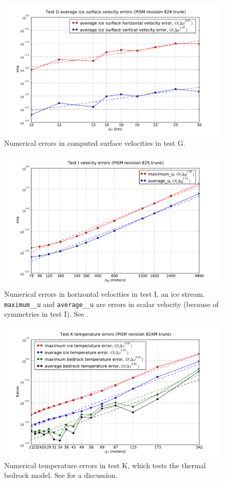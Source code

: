 \documentclass[11pt,final]{amsart}
\renewcommand{\t}[1]{\texttt{#1}}
\newcommand{\und}{\_\!\_}
\begin{document}
\begin{figure}[ht]
\includegraphics[width=5.0in,keepaspectratio=true]{figs/test-G-surfvels}
\caption{Numerical errors in computed surface velocities in test G.}
\label{fig:surfvelerrsG}
\end{figure}

\begin{figure}[ht]
\includegraphics[width=5.0in,keepaspectratio=true]{figs/test-I-errors}
\caption{Numerical errors in horizontal velocities in test I, an ice stream. \t{maximum\und u} and \t{average\und u} are errors in scalar velocity (because of symmetries in test I).  See \cite{SchoofStream,BBssasliding}.}
\label{fig:velerrsI}
\end{figure}

\begin{figure}[ht]
\includegraphics[width=5.0in,keepaspectratio=true]{figs/test-K-errors}
\caption{Numerical temperature errors in test K, which tests the thermal bedrock model.  See \cite{BuelerTestK} for a discussion.}
\label{fig:temperrsK}
\end{figure}
\end{document}
